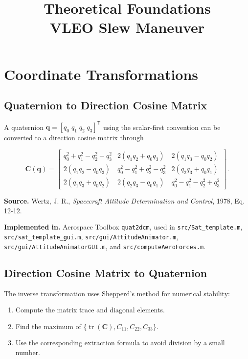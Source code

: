 \documentclass[11pt]{article}
\title{Theoretical Foundations\\\large VLEO Slew Maneuver}
\author{}
\date{}
\newcommand{\vect}[1]{\boldsymbol{#1}}
\newcommand{\transpose}{\mathsf{T}}
\begin{document}
\maketitle
\tableofcontents
\newpage

\section{Coordinate Transformations}

\subsection{Quaternion to Direction Cosine Matrix}

A quaternion $\vect{q} = [q_0\; q_1\; q_2\; q_3]^\transpose$ using the
scalar-first convention can be converted to a direction cosine matrix
through

\begin{equation}
\mathbf{C}(\vect{q}) =
\begin{bmatrix}
q_0^2 + q_1^2 - q_2^2 - q_3^2 & 2(q_1 q_2 + q_0 q_3) & 2(q_1 q_3 - q_0 q_2) \\
2(q_1 q_2 - q_0 q_3) & q_0^2 - q_1^2 + q_2^2 - q_3^2 & 2(q_2 q_3 + q_0 q_1) \\
2(q_1 q_3 + q_0 q_2) & 2(q_2 q_3 - q_0 q_1) & q_0^2 - q_1^2 - q_2^2 + q_3^2
\end{bmatrix}.
\end{equation}

\textbf{Source.} Wertz, J. R., \emph{Spacecraft Attitude Determination and
Control}, 1978, Eq. 12-12.

\textbf{Implemented in.} Aerospace Toolbox \texttt{quat2dcm}, used in
\texttt{src/Sat\_template.m}, \texttt{src/sat\_template\_gui.m},
\texttt{src/gui/AttitudeAnimator.m},
\texttt{src/gui/AttitudeAnimatorGUI.m}, and
\texttt{src/computeAeroForces.m}.

\subsection{Direction Cosine Matrix to Quaternion}

The inverse transformation uses Shepperd's method for numerical
stability:

\begin{enumerate}[label=\arabic*.]
\item Compute the matrix trace and diagonal elements.
\item Find the maximum of $\{\operatorname{tr}(\mathbf{C}), C_{11}, C_{22}, C_{33}\}$.
\item Use the corresponding extraction formula to avoid division by a
small number.
\end{enumerate}
\end{document}
